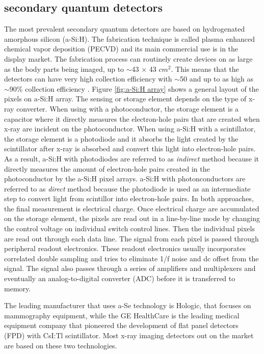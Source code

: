 \subsection{secondary quantum detectors}
The most prevalent secondary quantum detectors are based on hydrogenated amorphous silicon (a-Si:H).  The fabrication technique is called plasma enhanced chemical vapor deposition (PECVD) and its main commercial use is in the display market.  The fabrication process can routinely create devices on as large as the body parts being imaged, up to $\sim$43 $\times$ 43 $cm^2$.  This means that the detectors can have very high collection efficiency with $\sim$50 and up to as high as $\sim$90$\%$ collection efficiency \cite{yorkston2007}.
Figure \ref{fig:a-Si:H array} shows a general layout of the pixels on a-Si:H array.  The sensing or storage element depends on the type of x-ray converter.  When using with a photoconductor, the storage element is a capacitor where it directly measures the electron-hole pairs that are created when x-ray are incident on the photoconductor.  When using a-Si:H with a scintillator, the storage element is a photodiode and it absorbs the light created by the scintillator after x-ray is absorbed and convert this light into electron-hole pairs.  As a result, a-Si:H with photodiodes are referred to as \textit{indirect} method because it directly measures the amount of electron-hole pairs created in the photoconductor by the a-Si:H pixel arrays.  a-Si:H with photonconductors are referred to as \textit{direct} method because the photodiode is used as an intermediate step to convert light from scintillor into electron-hole pairs.  In both approaches, the final measurement is electrical charge.  
Once electrical charge are accumulated on the storage element, the pixels are read out in a line-by-line mode by changing the control voltage on individual switch control lines.  Then the individual pixels are read out through each data line.  The signal from each pixel is passed through peripheral readout electronics.  These readout electronics usually incorporates correlated double sampling and tries to eliminate 1/f noise and dc offset from the signal.  The signal also passes through a series of amplifiers and multiplexers and eventually an analog-to-digital converter (ADC) before it is transferred to memory.  

The leading manufacturer that uses a-Se technology is Hologic, that focuses on mammography equipment, while the GE HealthCare is the leading medical equipment company that pioneered the development of flat panel detectors (FPD) with CsI:Tl scintillator.  Most x-ray imaging detectors out on the market are based on these two technologies.  

